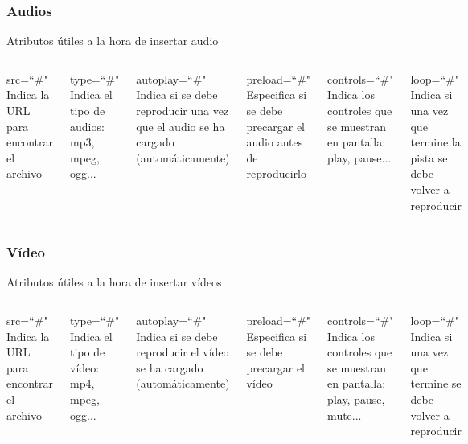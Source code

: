 \documentclass{beamer}
\begin{document}
\begin{frame}[fragile]
\frametitle{Audios}
	Atributos útiles a la hora de insertar audio
	\begin{columns}[c]
	\begin{block}{src=``\#"}
	Indica la URL para encontrar el archivo
	\end{block}
	\pause
	\begin{block}{type=``\#"}
	Indica el tipo de audios: mp3, mpeg, ogg...
	\end{block}
	\pause
	\begin{block}{autoplay=``\#"}
	Indica si se debe reproducir una vez que el audio se ha cargado (automáticamente)
	\end{block}
	\pause
	\begin{block}{preload=``\#"}
	Especifica si se debe precargar el audio antes de reproducirlo
	\end{block}
	\pause
	\begin{block}{controls=``\#"}
	Indica los controles que se muestran en pantalla: play, pause...
	\end{block}
	\pause
	\begin{block}{loop=``\#"}
	Indica si una vez que termine la pista se debe volver a reproducir
	\end{block}	
	\end{columns}
\end{frame}	

\begin{frame}[fragile]
\frametitle{Vídeo}
	Atributos útiles a la hora de insertar vídeos
	\begin{columns}[c]
	\begin{block}{src=``\#"}
	Indica la URL para encontrar el archivo
	\end{block}
	\pause
	\begin{block}{type=``\#"}
	Indica el tipo de vídeo: mp4, mpeg, ogg...
	\end{block}
	\pause
	\begin{block}{autoplay=``\#"}
	Indica si se debe reproducir el vídeo se ha cargado (automáticamente)
	\end{block}
	\pause
	\begin{block}{preload=``\#"}
	Especifica si se debe precargar el vídeo
	\end{block}
	\pause
	\begin{block}{controls=``\#"}
	Indica los controles que se muestran en pantalla: play, pause, mute...
	\end{block}
	\pause
	\begin{block}{loop=``\#"}
	Indica si una vez que termine se debe volver a reproducir
	\end{block}	
	\end{columns}
\end{frame}	
\end{document}

